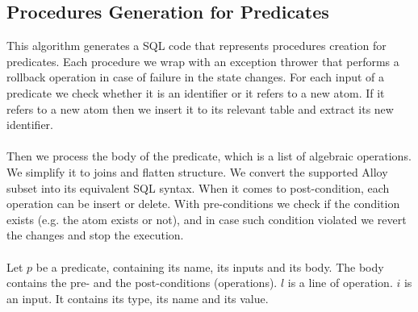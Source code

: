 \documentclass[oneside]{book}
\begin{document}
\subsection{Procedures Generation for Predicates}
This algorithm generates a SQL code that represents procedures creation for predicates. Each procedure we wrap with an exception thrower that performs a rollback operation in case of failure in the state changes. For each input of a predicate we check whether it is an identifier or it refers to a new atom. If it refers to a new atom then we insert it to its relevant table and extract its new identifier. 
\\\\
Then we process the body of the predicate, which is a list of algebraic operations. We simplify it to joins and flatten structure. We convert the supported Alloy subset into its equivalent SQL syntax. When it comes to post-condition, each operation can be insert or delete. With pre-conditions we check if the condition exists (e.g. the atom exists or not), and in case such condition violated we revert the changes and stop the execution. 
\\\\
Let $p$ be a predicate, containing its name, its inputs and its body. The body contains the pre- and the post-conditions (operations). $l$ is a line of operation. $i$ is an input. It contains its type, its name and its value.\\
\end{document}
